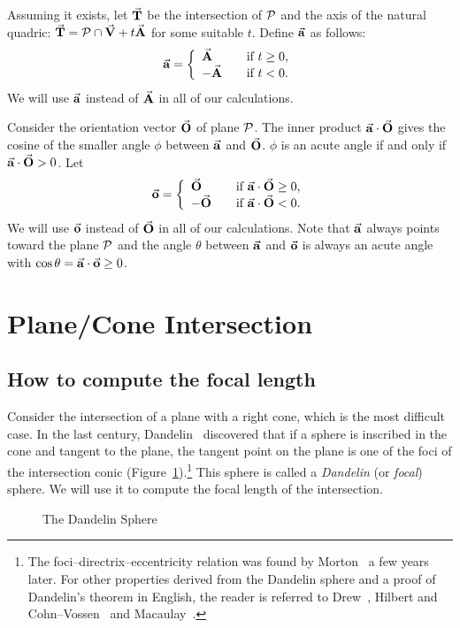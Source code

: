      Assuming it exists, let $\vec{\bf T}$ be the intersection of ${\cal P}$ 
and the axis of the natural quadric: 
$\vec{\bf T}={\cal P}\cap \vec{\bf V}+t\vec{\bf A}$ for some suitable $t$.  
Define $\vec{\bf a}$ as follows:
\[ \vec{\bf a} = \left\{
                    \begin{array}{lll}
                         \vec{\bf A} & & \mbox{if $t\geq 0$,} \\
                         -\vec{\bf A} & & \mbox{if $t< 0$.}
                    \end{array} \right. \]
We will use $\vec{\bf a}$ instead of $\vec{\bf A}$ in all of our calculations.

     Consider the orientation vector $\vec{\bf O}$ of plane ${\cal P}$.
The inner product $\vec{\bf a}\cdot\vec{\bf O}$ gives the cosine of the smaller
angle $\phi$ between $\vec{\bf a}$ and $\vec{\bf O}$.  $\phi$ is an acute angle
if and only if $\vec{\bf a}\cdot\vec{\bf O}>0$.  Let
\[ \vec{\bf o} = \left\{
                    \begin{array}{lll}
                     \vec{\bf O} & & \mbox{if $\vec{\bf a}\cdot\vec{\bf O}\geq 0$,}\\
                     -\vec{\bf O} & & \mbox{if $\vec{\bf a}\cdot\vec{\bf O}< 0$.}
                    \end{array} \right. \]
We will use $\vec{\bf o}$ instead of $\vec{\bf O}$ in all of our calculations.
Note that $\vec{\bf a}$ always points toward the plane ${\cal P}$ and 
the angle $\theta$ between $\vec{\bf a}$ and $\vec{\bf o}$ is always
an acute angle with $\cos\theta=\vec{\bf a}\cdot\vec{\bf o}\geq 0$.

\section{Plane/Cone Intersection}
\label{section:cone}

\subsection{How to compute the focal length}

Consider the intersection of a plane with a right cone, which
is the most difficult case.
In the last century, Dandelin~\cite{dandelin:1822} discovered that if a 
sphere is inscribed in the cone and tangent to the plane, the tangent point 
on the plane is one of the foci of the intersection conic 
(Figure~\ref{dandelin-sphere}).\footnote{The foci--directrix--eccentricity 
	relation was found by Morton~\cite{morton:1830} a few years later.
	For other properties derived from the Dandelin
	sphere and a proof of Dandelin's theorem in English,
	the reader is referred to
	Drew~\cite{drew:1875}, Hilbert and Cohn--Vossen~\cite{hilbert:1983}
	and Macaulay~\cite{macaulay:1895}.}
This sphere is called a {\em Dandelin} (or {\em focal}) sphere. 
We will use it to compute the focal length of the intersection.
\begin{figure}
\vspace{4.5cm}
\caption{The Dandelin Sphere}
\label{dandelin-sphere}
\end{figure}

